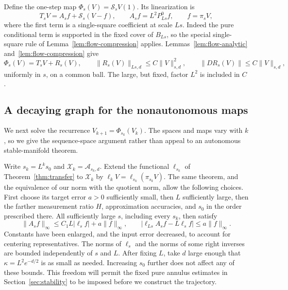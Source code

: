 Define the one-step map \(\Phi_s(V)=\mathcal S_sV(1)\).  Its linearization
is
\begin{equation}\label{eq:flow-linearization}
 T_sV=A_sf+\mathcal S_s(V-f),\qquad
 A_sf=L^2P^0_{Ls}f,\qquad f=\pi_sV,
\end{equation}
where the first term is a single-square coefficient at scale \(Ls\).
Indeed the pure conditional term is supported in the fixed cover of
\(B_{Ls}\), so the special single-square rule of
Lemma~\ref{lem:flow-compression} applies.  Lemmas~\ref{lem:flow-analytic}
and~\ref{lem:flow-compression} give
\begin{equation}\label{eq:flow-map-remainder}
 \Phi_s(V)=T_sV+R_s(V),\qquad
 \|R_s(V)\|_{Ls,d}\le C\|V\|_{s,d}^2,
 \qquad \|DR_s(V)\|\le C\|V\|_{s,d},
\end{equation}
uniformly in \(s\), on a common ball.  The large, but fixed, factor
\(L^2\) is included in \(C\).

\subsection{A decaying graph for the nonautonomous maps}

We next solve the recurrence \(V_{k+1}=\Phi_{s_k}(V_k)\).  The spaces and
maps vary with \(k\), so we give the sequence-space argument rather than
appeal to an autonomous stable-manifold theorem.

Write \(s_k=L^ks_0\) and \(\mathcal X_k=\mathcal A_{s_k,d}\).
Extend the functional \(\ell_{s_k}\) of
Theorem~\ref{thm:transfer} to \(\mathcal X_k\) by
\(\ell_kV=\ell_{s_k}(\pi_{s_k}V)\).  The same theorem, and the equivalence
of our norm with the quotient norm, allow the following choices.  First
choose its target error \(a>0\) sufficiently small, then \(L\) sufficiently
large, then the farther measurement ratio \(H\), approximation accuracies,
and \(s_0\) in the order prescribed there.  All sufficiently large
\(s\), including every \(s_k\), then satisfy
\begin{equation}\label{eq:flow-transfer-use}
 \|A_sf\|_\infty\le C_1L|\ell_sf|+a\|f\|_\infty,
 \qquad
 |\ell_{Ls}A_sf-L\ell_sf|\le a\|f\|_\infty.
\end{equation}
Constants have been enlarged, and the input error decreased, to account
for centering representatives.  The norms of \(\ell_s\) and the norms
of some right inverses are bounded independently of \(s\) and \(L\).
After fixing \(L\), take \(d\) large enough that
\(\kappa=L^2e^{-d/2}\) is as small as needed.  Increasing \(s_0\) further
does not affect any of these bounds.  This freedom will permit the fixed
pure annulus estimates in Section~\ref{sec:stability} to be imposed before
we construct the trajectory.

